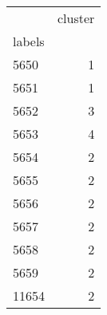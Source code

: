 \begin{tabular}{lr}
\toprule
{} &  cluster \\
labels &          \\
\midrule
5650   &        1 \\
5651   &        1 \\
5652   &        3 \\
5653   &        4 \\
5654   &        2 \\
5655   &        2 \\
5656   &        2 \\
5657   &        2 \\
5658   &        2 \\
5659   &        2 \\
11654  &        2 \\
\bottomrule
\end{tabular}
